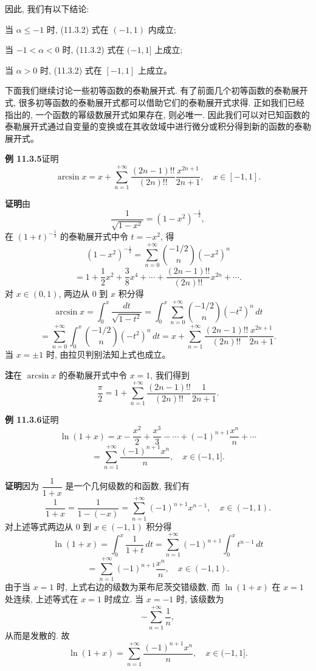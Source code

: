\documentclass[UTF8,12pt,a4paper,fontset=fandol]{ctexart}
\begin{document}
因此, 我们有以下结论:

当 $\alpha\leqslant-1$ 时, (11.3.2) 式在 $(-1,1)$ 内成立;

当 $-1<\alpha<0$ 时, (11.3.2) 式在 $(-1,1]$ 上成立;

当 $\alpha>0$ 时, (11.3.2) 式在 $[-1,1]$ 上成立。

下面我们继续讨论一些初等函数的泰勒展开式. 有了前面几个初等函数的泰勒展开式, 很多初等函数的泰勒展开式都可以借助它们的泰勒展开式求得. 正如我们已经指出的, 一个函数的幂级数展开式如果存在, 则必唯一. 因此我们可以对已知函数的泰勒展开式通过自变量的变换或在其收敛域中进行微分或积分得到新的函数的泰勒展开式。

\noindent\textbf{例 11.3.5}\quad 证明
\[
  \arcsin x
  =
  x+\sum_{n=1}^{+\infty}
  \frac{(2n-1)!!}{(2n)!!}\frac{x^{2n+1}}{2n+1},
  \quad x\in[-1,1].
\]

\noindent\textbf{证明}\quad 由
\[
  \frac1{\sqrt{1-x^2}}=(1-x^2)^{-\frac12},
\]
在 $(1+t)^{-\frac12}$ 的泰勒展开式中令 $t=-x^2$, 得
\[
  (1-x^2)^{-\frac12}
  =
  \sum_{n=0}^{+\infty}\binom{-1/2}{n}(-x^2)^n
\]
\[
  =
  1+\frac12x^2+\frac38x^4+\cdots
  +\frac{(2n-1)!!}{(2n)!!}x^{2n}+\cdots .
\]
对 $x\in(0,1)$, 两边从 $0$ 到 $x$ 积分得
\[
  \arcsin x
  =
  \int_0^x\frac{dt}{\sqrt{1-t^2}}
  =
  \int_0^x
  \sum_{n=0}^{+\infty}\binom{-1/2}{n}(-t^2)^n\,dt
\]
\[
  =
  \sum_{n=0}^{+\infty}
  \int_0^x\binom{-1/2}{n}(-t^2)^n\,dt
  =
  x+\sum_{n=1}^{+\infty}
  \frac{(2n-1)!!}{(2n)!!}\frac{x^{2n+1}}{2n+1}.
\]
当 $x=\pm1$ 时, 由拉贝判别法知上式也成立。

\noindent\textbf{注}\quad 在 $\arcsin x$ 的泰勒展开式中令 $x=1$, 我们得到
\[
  \frac{\pi}{2}
  =
  1+\sum_{n=1}^{+\infty}
  \frac{(2n-1)!!}{(2n)!!}\frac1{2n+1}.
\]

\noindent\textbf{例 11.3.6}\quad 证明
\[
  \ln(1+x)
  =
  x-\frac{x^2}{2}+\frac{x^3}{3}-\cdots
  +(-1)^{n+1}\frac{x^n}{n}+\cdots
\]
\[
  =
  \sum_{n=1}^{+\infty}\frac{(-1)^{n+1}x^n}{n},
  \quad x\in(-1,1].
\]

\noindent\textbf{证明}\quad 因为 $\dfrac1{1+x}$ 是一个几何级数的和函数, 我们有
\[
  \frac1{1+x}
  =
  \frac1{1-(-x)}
  =
  \sum_{n=1}^{+\infty}(-1)^{n+1}x^{n-1},
  \quad x\in(-1,1).
\]
对上述等式两边从 $0$ 到 $x\in(-1,1)$ 积分得
\[
  \ln(1+x)
  =
  \int_0^x\frac1{1+t}\,dt
  =
  \sum_{n=1}^{+\infty}(-1)^{n+1}\int_0^x t^{n-1}\,dt
\]
\[
  =
  \sum_{n=1}^{+\infty}(-1)^{n+1}\frac{x^n}{n},
  \quad x\in(-1,1).
\]
由于当 $x=1$ 时, 上式右边的级数为莱布尼茨交错级数, 而 $\ln(1+x)$ 在 $x=1$ 处连续, 上述等式在 $x=1$ 时成立. 当 $x=-1$ 时, 该级数为
\[
  -\sum_{n=1}^{+\infty}\frac1n,
\]
从而是发散的. 故
\[
  \ln(1+x)
  =
  \sum_{n=1}^{+\infty}\frac{(-1)^{n+1}x^n}{n},
  \quad x\in(-1,1].
\]
\end{document}
